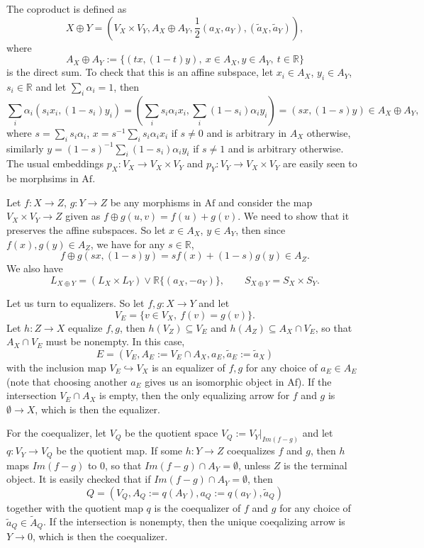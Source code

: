 \documentclass[12pt]{article}
\theoremstyle{definition}
\theoremstyle{remark}
\def \Af{\mathrm{Af}}
\def\bE{ E}
\def\bX{ X}
\def\bY{ Y}
\def\bZ{Z}
\begin{document}
The coproduct is defined as 
\[
\bX\oplus \bY=(V_\bX\times V_\bY, A_\bX\oplus A_\bY,\frac12(a_X,a_Y), (\tilde a_X,\tilde
a_Y)),
\]
where 
\[
A_\bX\oplus A_\bY:=\{(tx,(1-t)y),\ x\in A_{\bX}, y\in A_\bY,\ t\in \mathbb R\}
\]
is the direct sum. To check that this is an affine subspace, let $x_i\in A_\bX$, $y_i\in A_\bY$, $s_i\in
\mathbb R$ and let $\sum_i\alpha_i=1$, then 
\[
\sum_i\alpha_i(s_ix_i,(1-s_i)y_i)=(\sum_is_i\alpha_ix_i,\sum_i(1-s_i)\alpha_iy_i)=(sx,(1-s)y)\in
A_\bX\oplus A_\bY,
\]
where $s=\sum_is_i\alpha_i$, $x=s^{-1}\sum_is_i\alpha_ix_i$ if $s\ne 0$ and is arbitrary
in $A_\bX$ otherwise, similarly $y=(1-s)^{-1}\sum_i(1-s_i)\alpha_iy_i$ if $s\ne 1$ and is
arbitrary otherwise. The usual embeddings  $p_\bX:V_\bX\to V_\bX\times V_\bY$ and $p_\bY:
V_{\bY}\to V_\bX\times V_\bY$ are easily seen to be morphsims in $\Af$.   

Let  $f:\bX\to \bZ$, $g:\bY\to \bZ$ be any morphisms in $\Af$ and consider the map
$V_\bX\times V_\bY\to \bZ$ given as
$f\oplus g(u,v)=f(u)+g(v)$. We need to show that it preserves the affine subspaces. So let 
$x\in A_\bX$, $y\in  A_\bY$, then since $f(x),g(y)\in A_\bZ$, we have for any $s\in \mathbb R$,
\[
f\oplus g(sx,(1-s)y)=sf(x)+(1-s)g(y)\in A_\bZ.
\]
We also have
\[
L_{X\oplus Y}= (L_X\times L_Y)\vee \mathbb R\{(a_X,-a_Y)\},\qquad S_{X\oplus Y}=S_X\times
S_Y.
\]


Let us turn to equalizers. So let $f,g:\bX\to \bY$ and let 
\[
V_E=\{v\in V_\bX,\ f(v)=g(v)\}. 
\]
Let $h: \bZ\to \bX$ equalize $f,g$, then $h(V_\bZ)\subseteq V_E$ and $h(A_\bZ)\subseteq
A_\bX\cap V_E$, so that $A_\bX\cap V_E$ must be nonempty. In this case, 
\[
\bE=(V_E, A_E:=V_E\cap A_\bX, a_E,\tilde a_E:=\tilde a_X)
\]
with the inclusion map $V_E\hookrightarrow V_\bX$ is an
equalizer of $f,g$ for any choice of $a_E\in A_E$ (note that choosing another $a_E$ gives
us an isomorphic object in $\Af$). If the
intersection $V_E\cap A_\bX$ is empty, then the only equalizing arrow 
for $f$ and $g$ is $\emptyset\to \bX$, which is
then the equalizer.

For the coequalizer, let $V_Q$ be the quotient space $V_Q:=V_\bY|_{Im(f-g)}$ and let
$q:V_\bY\to V_Q$
be the quotient map. If  some $h: \bY\to \bZ$ coequalizes $f$ and $g$, then $h$ maps
$Im(f-g)$ to 0, so that $Im(f-g)\cap A_\bY=\emptyset$, unless $\bZ$ is the terminal
object. It is easily checked that if $Im(f-g)\cap A_\bY=\emptyset$, then
\[
Q=(V_Q,A_Q:=q(A_\bY),a_Q:=q(a_Y),\tilde a_Q )
\]
together with the quotient map  $q$ is the
coequalizer of $f$ and $g$ for any choice of $\tilde a_Q\in \tilde A_Q$.
If the intersection is nonempty,
then the unique coeqalizing arrow is $\bY\to 0$, which is then the coequalizer.
\end{document}

